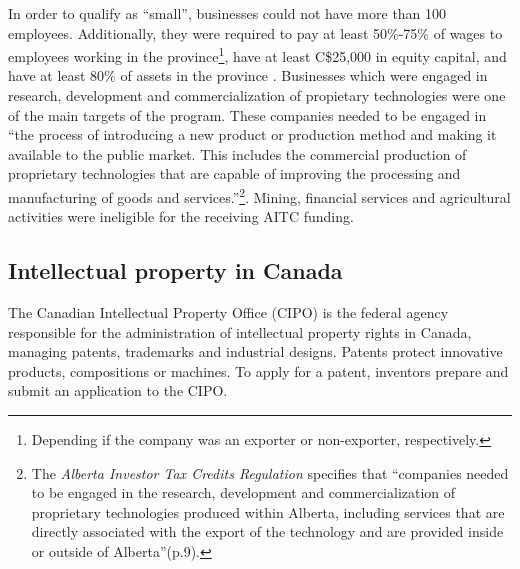 \documentclass[../main.tex]{subfiles}
\begin{document}
In order to qualify as \enquote{small}, businesses could not have more than 100 employees. Additionally, they were required to pay at least 50\%-75\% of wages to employees working in the province\footnote{Depending if the company was an exporter or non-exporter, respectively.}, have at least C\$25,000 in equity capital, and have at least 80\% of assets in the province \parencite{albertaeconomicdevelopmentandtrade19}. Businesses which were engaged in research, development and commercialization of propietary technologies were one of the main targets of the program. These companies needed to be engaged in \enquote{the process of introducing a new product or production method and making it available to the public market. This includes the commercial production of proprietary technologies that are capable of improving the processing and manufacturing of goods and services.}\parencite[19]{albertaeconomicdevelopmentandtrade19}\footnote{The \textit{Alberta Investor Tax Credits Regulation}\nocite{Alberta19a} specifies that \enquote{companies needed to be engaged in the research, development and commercialization of proprietary technologies produced within Alberta, including services that are directly associated with the export of the technology and are provided inside or outside of Alberta}(p.9).}. Mining, financial services and agricultural activities were ineligible for the receiving AITC funding.

\subsection{Intellectual property in Canada}

The Canadian Intellectual Property Office (CIPO) is the federal agency responsible for the administration of intellectual property rights in Canada, managing patents, trademarks and industrial designs. Patents protect innovative products, compositions or machines. To apply for a patent, inventors prepare and submit an application to the CIPO. 
\end{document}
